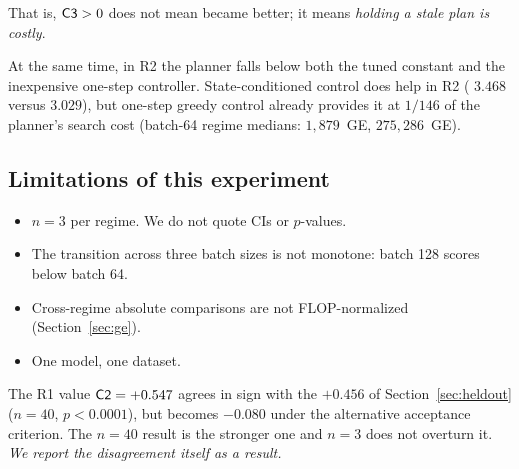 That is, $\textsf{C3} > 0$ does not mean  became better; it means
\emph{holding a stale plan is costly}.

At the same time, in R2 the planner falls below both the tuned constant and the
inexpensive one-step controller. State-conditioned control does help in R2
( $3.468$ versus  $3.029$), but one-step greedy
control already provides it at $1/146$ of the planner's search cost (batch-64
regime medians:  $1{,}879$~GE,  $275{,}286$~GE).

\subsection{Limitations of this experiment}

\begin{itemize}
  \item $n = 3$ per regime. We do not quote CIs or $p$-values.
  \item The transition across three batch sizes is not monotone: batch 128 scores
        below batch 64.
  \item Cross-regime absolute comparisons are not FLOP-normalized
        (Section~\ref{sec:ge}).
  \item One model, one dataset.
\end{itemize}

The R1 value $\textsf{C2} = +0.547$ agrees in sign with the $+0.456$ of
Section~\ref{sec:heldout} ($n = 40$, $p < 0.0001$), but becomes $-0.080$ under the
alternative acceptance criterion. The $n = 40$ result is the stronger one and
$n = 3$ does not overturn it. \emph{We report the disagreement itself as a result.}
